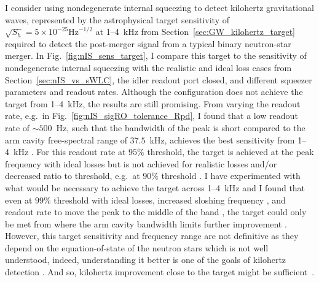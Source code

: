 I consider using nondegenerate internal squeezing to detect kilohertz gravitational waves, represented by the astrophysical target sensitivity of $\sqrt{S_h}=5\times10^{-25}\text{Hz}^{-1/2}$ at 1--4~kHz from Section~\ref{sec:GW_kilohertz_target} required to detect the post-merger signal from a typical binary neutron-star merger. In Fig.~\ref{fig:nIS_sens_target}, I compare this target to the sensitivity of nondegenerate internal squeezing with the realistic and ideal loss cases from Section~\ref{sec:nIS_vs_sWLC}, the idler readout port closed, and different squeezer parameters and readout rates. Although the configuration does not achieve the target from 1--4~kHz, the results are still promising.
From varying the readout rate, e.g.\ in Fig.~\ref{fig:nIS_sigRO_tolerance_Rpd}, I found that a low readout rate of $\sim 500$~Hz, such that the bandwidth of the peak is short compared to the arm cavity free-spectral range of $37.5$~kHz, achieves the best sensitivity from 1--4~kHz . For this readout rate at $95\%$ threshold, the target is achieved at the peak frequency  with ideal losses but is not achieved for realistic losses  and/or decreased ratio to threshold, e.g.\ at $90\%$ threshold . I have experimented with what would be necessary to achieve the target across 1--4~kHz and I found that even at $99\%$ threshold with ideal losses, increased sloshing frequency , and readout rate to move the peak to the middle of the band , the target could only be met from  where the arm cavity bandwidth limits further improvement . 
However, this target sensitivity and frequency range are not definitive as they depend on the equation-of-state of the neutron stars which is not well understood, indeed, understanding it better is one of the goals of kilohertz detection . And so, kilohertz improvement close to the target might be sufficient~\cite{}.
